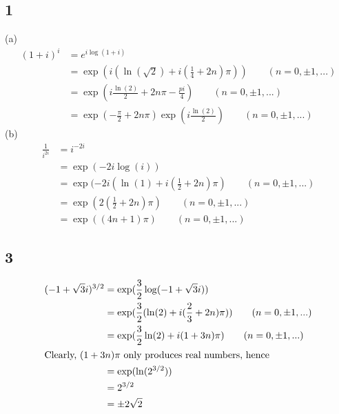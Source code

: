 \documentclass{article}
\begin{document}
\subsection*{1} %
(a) \begin{align*}
    (1 + i)^i & = e^{i\log(1+i)}                                                               \\
              & = \exp(i(\ln(\sqrt{2})+ i(\frac{1}{4} + 2n)\pi)) \qquad (n=0,\pm 1,...)        \\
              & = \exp(i\frac{\ln(2)}{2} + 2n\pi - \frac{pi}{4}) \qquad (n = 0, \pm 1,...)     \\
              & = \exp(-\frac{\pi}{2} + 2n\pi)\exp(i\frac{\ln(2)}{2}) \qquad (n= 0, \pm 1,...)
\end{align*}
(b) \begin{align*}
    \frac{1}{i^{2i}} & = i^{-2i}                                                            \\
                     & = \exp(-2i\log(i))                                                   \\
                     & = \exp(-2i(\ln(1) + i(\frac{1}{2} + 2n)\pi) \qquad (n= 0, \pm 1,...) \\
                     & = \exp(2(\frac{1}{2} + 2n)\pi) \qquad (n= 0, \pm 1,...)              \\
                     & = \exp((4n + 1)\pi) \qquad (n=0,\pm 1,...)
\end{align*}
\subsection*{3} %
\begin{align*}
    (-1 + \sqrt{3}i)^{3/2} & = \exp(\frac{3}{2}\log(-1 + \sqrt{3}i))                                   \\
                           & = \exp(\frac{3}{2}(\ln(2) + i(\frac{2}{3} +2n)\pi)) \qquad (n=0,\pm1,...) \\
                           & = \exp(\frac{3}{2}\ln(2) + i(1 + 3n)\pi) \qquad (n=0,\pm 1,...)           \\
    \intertext{Clearly, $(1 + 3n)\pi$ only produces real numbers, hence}
                           & = \exp(\ln(2^{3/2}))                                                      \\
                           & = 2^{3/2}                                                                 \\
                           & = \pm 2\sqrt{2}
\end{align*}
\end{document}

